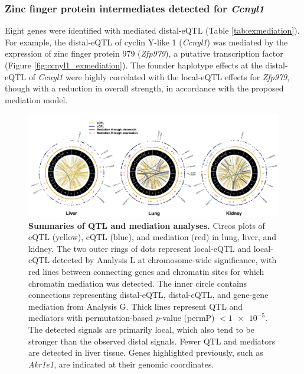 \documentclass[9pt,twocolumn,twoside]{gsajnl}
\begin{document}
\subsubsection{Zinc finger protein intermediates detected for \textit{Ccnyl1}}
Eight genes were identified with mediated distal-eQTL (Table \ref{tab:exmediation}). For example, the distal-eQTL of cyclin Y-like 1 (\textit{Ccnyl1}) was mediated by the expression of zinc finger protein 979 (\textit{Zfp979}), a putative transcription factor (Figure \ref{fig:ccnyl1_exmediation}). The founder haplotype effects at the distal-eQTL of \textit{Ccnyl1} were highly correlated with the local-eQTL effects for \textit{Zfp979}, though with a reduction in overall strength, in accordance with the proposed mediation model.

\begin{figure}[h!]
\renewcommand{\familydefault}{\sfdefault}\normalfont
\centering
\includegraphics[width=\textwidth, trim={0in 0in 0in 0in}, clip]{figs/circos_over_tissues.png}
\caption{\textbf{Summaries of QTL and mediation analyses.} Circos plots of eQTL (yellow), cQTL (blue), and mediation (red) in lung, liver, and kidney. The two outer rings of dots represent local-eQTL and local-cQTL detected by Analysis L at chromosome-wide significance, with red lines between connecting genes and chromatin sites for which chromatin mediation was detected. The inner circle contains connections representing distal-eQTL, distal-cQTL, and gene-gene mediation from Analysis G. Thick lines represent QTL and mediators with permutation-based $p$-value (permP) $< \num{1e-5}$. The detected signals are primarily local, which also tend to be stronger than the observed distal signals. Fewer QTL and mediators are detected in liver tissue. 
Genes highlighted previously, such as \textit{Akr1e1}, are indicated at their genomic coordinates.
\label{fig:circos_plot}}
\end{figure}
\end{document}

